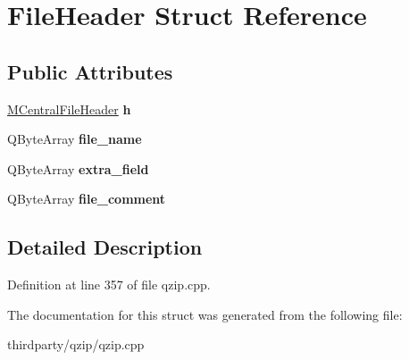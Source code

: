\hypertarget{struct_file_header}{}\section{File\+Header Struct Reference}
\label{struct_file_header}
\subsection*{Public Attributes}
\begin{DoxyCompactItemize}
\item 
\mbox{\label{struct_file_header_a98d26b39b4e15a1c05321f60885ec47f}} 
\hyperlink{struct_m_central_file_header}{M\+Central\+File\+Header} {\bfseries h}
\item 
\mbox{\label{struct_file_header_a1e548949bd7e394bde8aadecf1883946}} 
Q\+Byte\+Array {\bfseries file\+\_\+name}
\item 
\mbox{\label{struct_file_header_a19a9edd368cdc1f31743e0974cfefdbb}} 
Q\+Byte\+Array {\bfseries extra\+\_\+field}
\item 
\mbox{\label{struct_file_header_af59ed7b2ac1f5363990939cceb7f3c68}} 
Q\+Byte\+Array {\bfseries file\+\_\+comment}
\end{DoxyCompactItemize}


\subsection{Detailed Description}


Definition at line 357 of file qzip.\+cpp.



The documentation for this struct was generated from the following file\+:\begin{DoxyCompactItemize}
\item 
thirdparty/qzip/qzip.\+cpp\end{DoxyCompactItemize}
